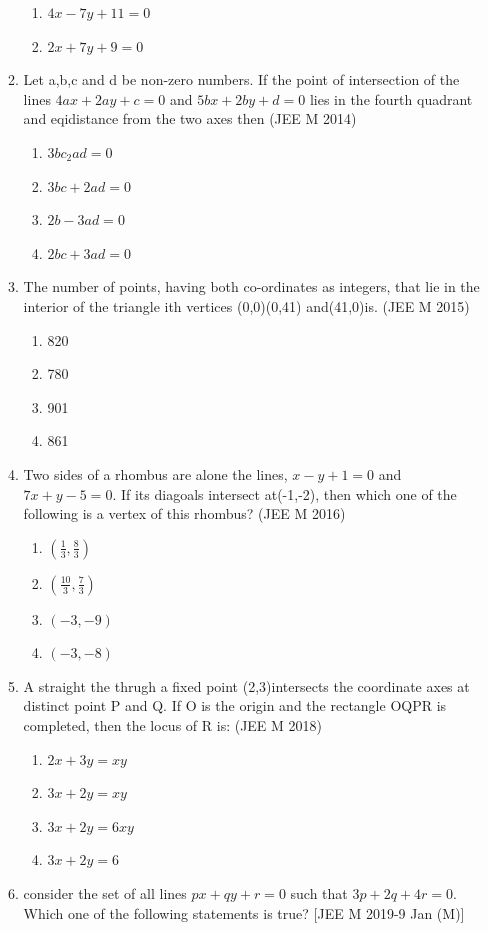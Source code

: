 \documentclass[12pt]{article}
\providecommand{\brak}[1]{\ensuremath{\left(#1\right)}}
\begin{document}
\begin{enumerate}
\begin{enumerate}
\begin{enumerate}
\item $4x-7y+11=0$ 
\item $2x+7y+9=0$ 
\end{enumerate}
\item Let a,b,c and d be non-zero numbers. If the point of intersection of the lines $4ax+2ay+c=0$ and $5bx+2by+d=0$ lies in the fourth quadrant and eqidistance from the two axes then (JEE M 2014)
\begin{enumerate}
\item $3bc_2ad=0$  
\item $3bc+2ad=0$
\item $2b-3ad=0$ 
\item $2bc+3ad=0$
\end{enumerate}
\item The number of points, having both co-ordinates as integers, that lie in the interior of the triangle ith vertices (0,0)(0,41) and(41,0)is. (JEE M 2015)
\begin{enumerate}
\item 820 
\item 780 
\item 901 
\item 861
\end{enumerate}
\item Two sides  of a rhombus are alone the lines, $x-y+1=0$ and $7x+y-5=0$. If its diagoals intersect at(-1,-2), then which one of the following is a vertex of this rhombus? (JEE M 2016)
\begin{enumerate}
\item $\brak{\frac{1}{3},\frac{8}{3}}$ 
\item $\brak{\frac{10}{3},\frac{7}{3}}$ 
\item $\brak{-3,-9}$ 
\item $\brak{-3,-8}$
\end{enumerate}
\item A straight the thrugh a fixed point (2,3)intersects the coordinate axes at distinct point P  and Q. If O is the origin and the rectangle OQPR is completed, then the locus of R is: (JEE M 2018)
\begin{enumerate}
\item $2x+3y=xy$ 
\item $3x+2y=xy$ 
\item $3x+2y=6xy$ 
\item $3x+2y=6$
\end{enumerate}
\item consider the set of all lines $px+qy+r=0$ such that $3p+2q+4r=0$. Which one of the following statements is true? [JEE M 2019-9 Jan (M)]

\end{enumerate}
\end{enumerate}
\end{document}
